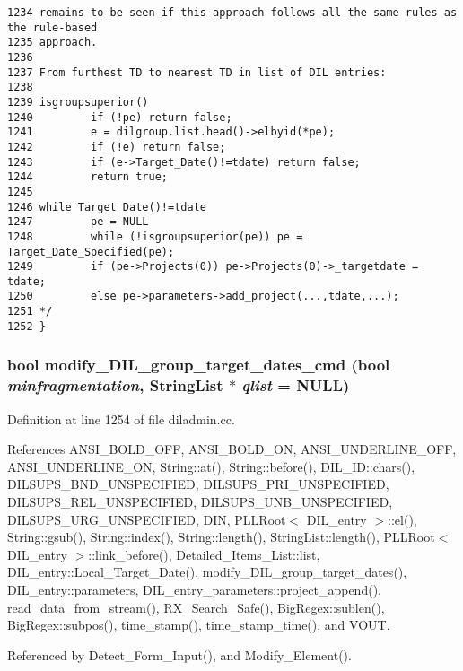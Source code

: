 \begin{verbatim}
1234 remains to be seen if this approach follows all the same rules as the rule-based
1235 approach.
1236 
1237 From furthest TD to nearest TD in list of DIL entries:
1238 
1239 isgroupsuperior()
1240         if (!pe) return false;
1241         e = dilgroup.list.head()->elbyid(*pe);
1242         if (!e) return false;
1243         if (e->Target_Date()!=tdate) return false;
1244         return true;
1245 
1246 while Target_Date()!=tdate
1247         pe = NULL
1248         while (!isgroupsuperior(pe)) pe = Target_Date_Specified(pe);
1249         if (pe->Projects(0)) pe->Projects(0)->_targetdate = tdate;
1250         else pe->parameters->add_project(...,tdate,...);
1251 */
1252 }
\end{verbatim}\normalsize 
{}
\subsubsection{\setlength{\rightskip}{0pt plus 5cm}bool modify\_\-DIL\_\-group\_\-target\_\-dates\_\-cmd (bool {\em minfragmentation}, {\bf String\-List} $\ast$ {\em qlist} = NULL)}\label{dil2al_8hh_a309}




Definition at line 1254 of file diladmin.cc.

References ANSI\_\-BOLD\_\-OFF, ANSI\_\-BOLD\_\-ON, ANSI\_\-UNDERLINE\_\-OFF, ANSI\_\-UNDERLINE\_\-ON, String::at(), String::before(), DIL\_\-ID::chars(), DILSUPS\_\-BND\_\-UNSPECIFIED, DILSUPS\_\-PRI\_\-UNSPECIFIED, DILSUPS\_\-REL\_\-UNSPECIFIED, DILSUPS\_\-UNB\_\-UNSPECIFIED, DILSUPS\_\-URG\_\-UNSPECIFIED, DIN, PLLRoot$<$ DIL\_\-entry $>$::el(), String::gsub(), String::index(), String::length(), String\-List::length(), PLLRoot$<$ DIL\_\-entry $>$::link\_\-before(), Detailed\_\-Items\_\-List::list, DIL\_\-entry::Local\_\-Target\_\-Date(), modify\_\-DIL\_\-group\_\-target\_\-dates(), DIL\_\-entry::parameters, DIL\_\-entry\_\-parameters::project\_\-append(), read\_\-data\_\-from\_\-stream(), RX\_\-Search\_\-Safe(), Big\-Regex::sublen(), Big\-Regex::subpos(), time\_\-stamp(), time\_\-stamp\_\-time(), and VOUT.

Referenced by Detect\_\-Form\_\-Input(), and Modify\_\-Element().



